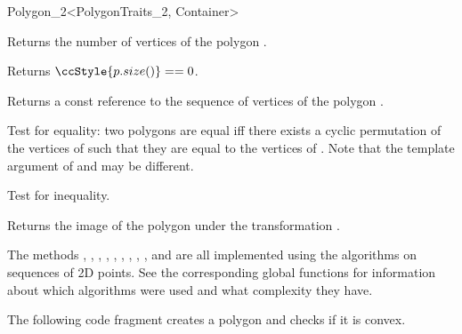 \begin{ccRefClass}{Polygon_2<PolygonTraits_2, Container>}

    { Returns the number of vertices of the polygon \ccVar.}

    { Returns $\ccStyle{p.size()} == 0$.}

    { Returns a const reference to the sequence of vertices of the polygon 
      \ccVar. }

  \ccHidden{}
    {}

     { Test for equality: two polygons are equal iff there exists a cyclic
       permutation of the vertices of  such that they are equal to the
       vertices of . Note that the template argument
        of  and  may be different. }

     { Test for inequality. }


  { Returns the image of the polygon  under the transformation . }




\ccImplementation

The methods
,
,
,
,
,
,
,
,
,
 and
are all implemented using the algorithms on sequences of 2D points.
See the corresponding global functions for information about which algorithms
were used and what complexity they have.

\ccExample

The following code fragment creates a polygon and checks if it is convex.



\end{ccRefClass}

